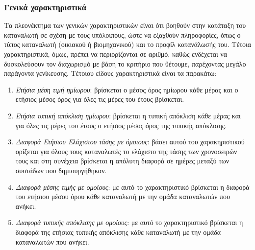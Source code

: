 \subsubsection{Γενικά χαρακτηριστικά} 
Τα πλεονέκτημα των γενικών χαρακτηριστικών είναι ότι βοηθούν στην κατάταξη του καταναλωτή σε σχέση με τους υπόλοιπους, ώστε να εξαχθούν πληροφορίες, όπως ο τύπος καταναλωτή (οικιακού ή βιομηχανικού) και το προφίλ κατανάλωσής του. Τέτοια χαρακτηριστικά, όμως, πρέπει να περιορίζονται σε αριθμό, καθώς ενδέχεται να δυσκολεύσουν τον διαχωρισμό με βάση το κριτήριο που θέτουμε, παρέχοντας μεγάλο παράγοντα γενίκευσης. Τέτοιου είδους χαρακτηριστικά είναι τα παρακάτω:
\begin{enumerate}
\item{\textit{Ετήσια μέση τιμή ημίωρου}}: βρίσκεται ο μέσος όρος ημίωρου κάθε μέρας και ο ετήσιος μέσος όρος για όλες τις μέρες του έτους βρίσκεται.
\item{\textit{Ετήσια τυπική απόκλιση ημίωρου}}: βρίσκεται η τυπική απόκλιση κάθε μέρας και για όλες τις μέρες του έτους ο ετήσιος μέσος όρος της τυπικής απόκλισης.
\item{\textit{Διαφορά Ετήσιου Ελάχιστου τάσης με όμοιους}}: βάσει αυτού του χαρακηριστικού ορίζεται για όλους τους καταναλωτές το ελάχιστο της τάσης των χρονοσειρών τους και στη συνέχεια βρίσκεται η απόλυτη διαφορά σε ημέρες μεταξύ των συστάδων που δημιουργήθηκαν.
\item{\textit{Διαφορά μέσης τιμής με ομοίους}}: με αυτό το χαρακτηριστικό βρίσκεται η διαφορά του ετήσιου μέσου όρου κάθε καταναλωτή με την ομάδα καταναλωτών που ανήκει.
\item{\textit{Διαφορά τυπικής απόκλισης με ομοίους}}: με αυτό το χαρακτηριστικό βρίσκεται η διαφορά της ετήσιας τυπικής απόκλισης κάθε καταναλωτή με την ομάδα καταναλωτών που ανήκει.
\end{enumerate}
